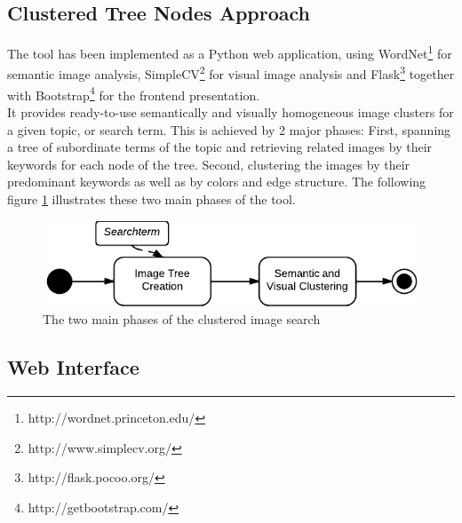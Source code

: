\subsection{Clustered Tree Nodes Approach}
The tool has been implemented as a Python web application, using WordNet\footnote{http://wordnet.princeton.edu/} for semantic image analysis, SimpleCV\footnote{http://www.simplecv.org/} for visual image analysis and Flask\footnote{http://flask.pocoo.org/} together with Bootstrap\footnote{http://getbootstrap.com/} for the frontend presentation.\\
It provides ready-to-use semantically and visually homogeneous image clusters for a given topic, or search term. This is achieved by 2 major phases: First, spanning a tree of subordinate terms of the topic and retrieving related images by their keywords for each node of the tree. Second, clustering the images by their predominant keywords as well as by colors and edge structure. The following figure \ref{fig_overallprocess} illustrates these two main phases of the tool.

\begin{figure}[h]
\centering
\includegraphics[]{images/search_process_highlevel.pdf}
\caption{The two main phases of the clustered image search}
\label{fig_overallprocess}
\end{figure}

\subsection{Web Interface}

